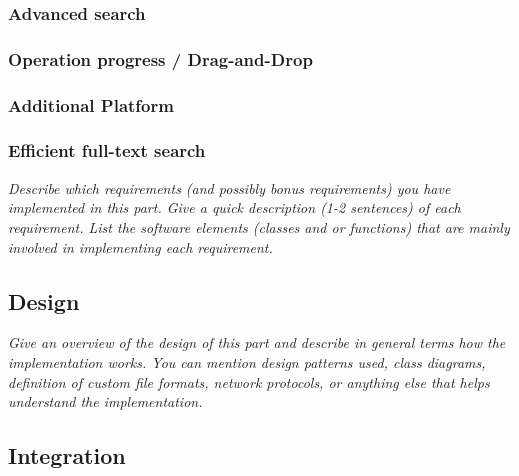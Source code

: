 \documentclass[a4paper,12pt]{article}
\begin{document}
\subsubsection{Advanced search}

\subsubsection{Operation progress / Drag-and-Drop}

\subsubsection{Additional Platform}

\subsubsection{Efficient full-text search}

\emph{Describe which requirements (and possibly bonus requirements) you have implemented in this part. Give a quick description (1-2 sentences) of each requirement. List the software elements (classes and or functions) that are mainly involved in implementing each requirement.}


\subsection{Design}

\emph{Give an overview of the design of this part and describe in general terms how the implementation works. You can mention design patterns used, class diagrams, definition of custom file formats, network protocols, or anything else that helps understand the implementation.}


\subsection{Integration}
\end{document}
